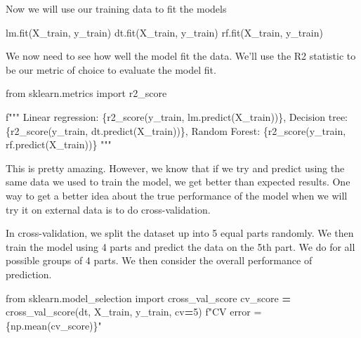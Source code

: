 \documentclass[
  letterpaper,
]{scrbook}
\newenvironment{Shaded}{\begin{snugshade}}{\end{snugshade}}
\newcommand{\DecValTok}[1]{\textcolor[rgb]{0.00,0.00,0.81}{#1}}
\newcommand{\ImportTok}[1]{#1}
\newcommand{\NormalTok}[1]{#1}
\newcommand{\OperatorTok}[1]{\textcolor[rgb]{0.81,0.36,0.00}{\textbf{#1}}}
\newcommand{\SpecialCharTok}[1]{\textcolor[rgb]{0.00,0.00,0.00}{#1}}
\newcommand{\SpecialStringTok}[1]{\textcolor[rgb]{0.31,0.60,0.02}{#1}}
\begin{document}
Now we will use our training data to fit the models

\begin{Shaded}
\begin{Highlighting}[]
\NormalTok{lm.fit(X\_train, y\_train)}
\NormalTok{dt.fit(X\_train, y\_train)}
\NormalTok{rf.fit(X\_train, y\_train)}
\end{Highlighting}
\end{Shaded}

We now need to see how well the model fit the data. We'll use the R2 statistic to be our metric of choice to evaluate the model fit.

\begin{Shaded}
\begin{Highlighting}[]
\ImportTok{from}\NormalTok{ sklearn.metrics }\ImportTok{import}\NormalTok{  r2\_score}

\SpecialStringTok{f"""}
\SpecialStringTok{Linear regression: }\SpecialCharTok{\{}\NormalTok{r2\_score(y\_train, lm.predict(X\_train))}\SpecialCharTok{\}}\SpecialStringTok{, }
\SpecialStringTok{Decision tree: }\SpecialCharTok{\{}\NormalTok{r2\_score(y\_train, dt.predict(X\_train))}\SpecialCharTok{\}}\SpecialStringTok{,}
\SpecialStringTok{Random Forest: }\SpecialCharTok{\{}\NormalTok{r2\_score(y\_train, rf.predict(X\_train))}\SpecialCharTok{\}}
\SpecialStringTok{"""}
\end{Highlighting}
\end{Shaded}

This is pretty amazing. However, we know that if we try and predict using the same data we used to train
the model, we get better than expected results. One way to get a better idea about the true performance of the
model when we will try it on external data is to do cross-validation.

In cross-validation, we split the dataset up into 5 equal parts randomly. We then train the
model using 4 parts and predict the data on the 5th part. We do for all possible groups of 4 parts. We then
consider the overall performance of prediction.

\begin{Shaded}
\begin{Highlighting}[]
\ImportTok{from}\NormalTok{ sklearn.model\_selection }\ImportTok{import}\NormalTok{ cross\_val\_score}
\NormalTok{cv\_score }\OperatorTok{=}\NormalTok{ cross\_val\_score(dt, X\_train, y\_train, cv}\OperatorTok{=}\DecValTok{5}\NormalTok{)}
\SpecialStringTok{f"CV error = }\SpecialCharTok{\{np.}\NormalTok{mean(cv\_score)}\SpecialCharTok{\}}\SpecialStringTok{"}
\end{Highlighting}
\end{Shaded}
\end{document}
